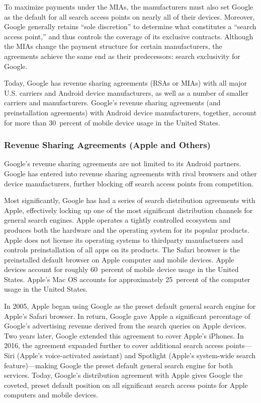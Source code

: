\documentclass[11pt,b5paper,headings=small]{scrartcl}
\begin{document}

To maximize payments under the MIAs, the manufacturers must also set Google
as the default for all search access points on nearly all of their devices. Moreover, Google
generally retains “sole discretion” to determine what constitutes a “search access point,” and thus
controls the coverage of its exclusive contracts. Although the MIAs change the payment
structure for certain manufacturers, the agreements achieve the same end as their predecessors:
search exclusivity for Google.


Today, Google has revenue sharing agreements (RSAs or MIAs) with all major
U.S. carriers and Android device manufacturers, as well as a number of smaller carriers and
manufacturers. Google’s revenue sharing agreements (and preinstallation agreements) with
Android device manufacturers, together, account for more than 30~percent of mobile device
usage in the United States.




\subsubsection{Revenue Sharing Agreements (Apple and Others)}
Google’s revenue sharing agreements are not limited to its Android partners.
Google has entered into revenue sharing agreements with rival browsers and other device
manufacturers, further blocking off search access points from competition.


Most significantly, Google has had a series of search distribution agreements with
Apple, effectively locking up one of the most significant distribution channels for general search
engines. Apple operates a tightly controlled ecosystem and produces both the hardware and the
operating system for its popular products. Apple does not license its operating systems to thirdparty manufacturers and controls preinstallation of all apps on its products. The Safari browser is
the preinstalled default browser on Apple computer and mobile devices. Apple devices account
for roughly 60~percent of mobile device usage in the United States. Apple’s Mac OS accounts for
approximately 25~percent of the computer usage in the United States.


In 2005, Apple began using Google as the preset default general search engine for
Apple’s Safari browser. In return, Google gave Apple a significant percentage of Google’s
advertising revenue derived from the search queries on Apple devices. Two years later, Google
extended this agreement to cover Apple’s iPhones. In 2016, the agreement expanded further to
cover additional search access points—Siri (Apple’s voice-activated assistant) and Spotlight
(Apple’s system-wide search feature)—making Google the preset default general search engine
for both services. Today, Google’s distribution agreement with Apple gives Google the coveted,
preset default position on all significant search access points for Apple computers and mobile
devices.
\end{document}
